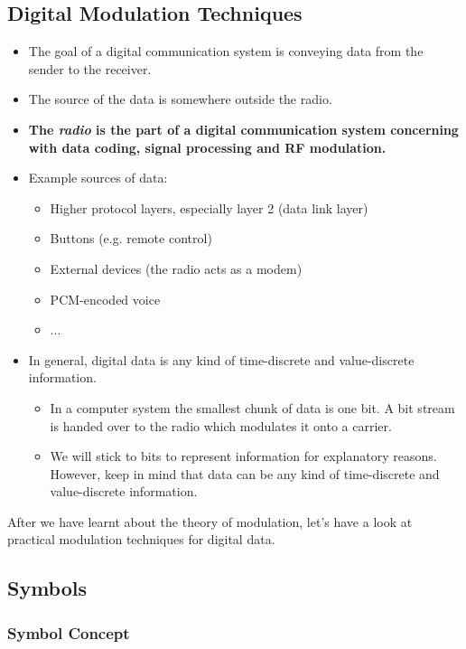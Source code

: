 \begin{refsection}
\section{Digital Modulation Techniques}

\begin{itemize}
	\item The goal of a digital communication system is conveying data from the sender to the receiver.
	\item The source of the data is somewhere outside the radio.
	\item \textbf{The  \emph{radio} is the part of a digital communication system concerning with data coding, signal processing and \ac{RF} modulation.}
	\item Example sources of data:
	\begin{itemize}
		\item Higher protocol layers, especially layer 2 (data link layer)
		\item Buttons (e.g. remote control)
		\item External devices (the radio acts as a modem)
		\item \ac{PCM}-encoded voice
		\item ...
	\end{itemize}
	\item In general, digital data is any kind of time-discrete and value-discrete information.
	\begin{itemize}
		\item In a computer system the smallest chunk of data is one bit. A bit stream is handed over to the radio which modulates it onto a carrier.
		\item We will stick to bits to represent information for explanatory reasons. However, keep in mind that data can be any kind of time-discrete and value-discrete information.
	\end{itemize}
\end{itemize}

After we have learnt about the theory of modulation, let's have a look at practical modulation techniques for digital data.

\subsection{Symbols}

\subsubsection{Symbol Concept}


\end{refsection}
